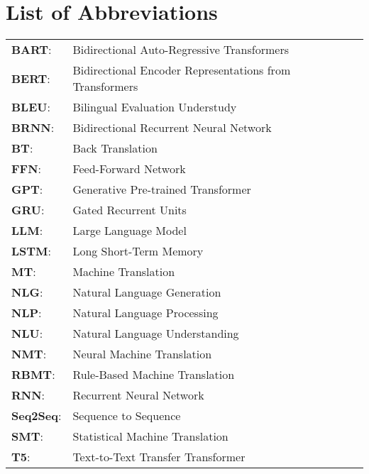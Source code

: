 \chapter*{List of Abbreviations }
\pagestyle{fancy}
\pagestyle{fancy}
\pagestyle{fancy}\rhead{\textbf \footnotesize\it{}}

\begin{tabular}{ll}
	\textbf{BART}:& Bidirectional Auto-Regressive Transformers\\
	\textbf{BERT}:& Bidirectional Encoder Representations from Transformers\\
	\textbf{BLEU}:& Bilingual Evaluation Understudy\\
	\textbf{BRNN}:& Bidirectional Recurrent Neural Network\\
	\textbf{BT}:& Back Translation\\
	\textbf{FFN}:& Feed-Forward Network\\
	\textbf{GPT}:& Generative Pre-trained Transformer\\
	\textbf{GRU}:& Gated Recurrent Units\\
	\textbf{LLM}:& Large Language Model\\
	\textbf{LSTM}:& Long Short-Term Memory\\
	\textbf{MT}:& Machine Translation\\
	\textbf{NLG}:& Natural Language Generation\\
	\textbf{NLP}:& Natural Language Processing\\
	\textbf{NLU}:& Natural Language Understanding\\
	\textbf{NMT}:& Neural Machine Translation\\
	\textbf{RBMT}:& Rule-Based Machine Translation\\
	\textbf{RNN}:& Recurrent Neural Network\\
	\textbf{Seq2Seq}:& Sequence to Sequence\\
	\textbf{SMT}:& Statistical Machine Translation\\
	\textbf{T5}:& Text-to-Text Transfer Transformer\\
\end{tabular}